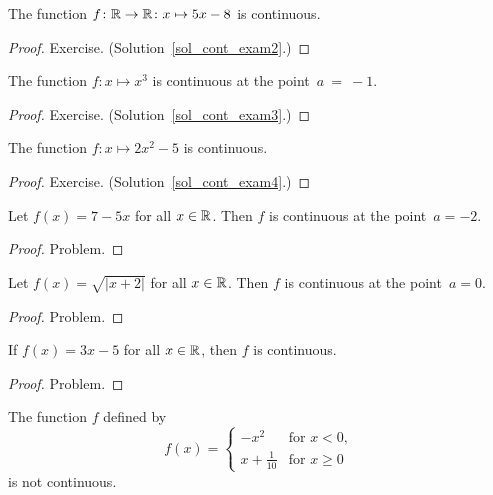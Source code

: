 \begin{exam}\label{cont_exam2} The function $f\colon\mathbb{R} \rightarrow \mathbb{R}\colon x \mapsto 5x - 8$ is continuous.
\end{exam}

\begin{proof} Exercise. (Solution~\ref{sol_cont_exam2}.)  \ns \end{proof}

\begin{exam}\label{cont_exam3} The function $f\colon x \mapsto x^3$ is continuous at the
point~$a~=~-1$.
\end{exam}

\begin{proof} Exercise. (Solution~\ref{sol_cont_exam3}.)  \ns \end{proof}

\begin{exam}\label{cont_exam4} The function $f\colon x \mapsto 2x^2 - 5$ is continuous.
\end{exam}

\begin{proof} Exercise.  (Solution~\ref{sol_cont_exam4}.)
  \ns \end{proof}

\begin{exam} Let $f(x) = 7 - 5x$ for all $x \in \mathbb{R}$. Then $f$ is continuous at the point~$a = -2$.
\end{exam}

\begin{proof} Problem.  \ns \end{proof}

\begin{exam} Let $f(x) = \sqrt{|x + 2|}$ for all $x \in \mathbb{R}$.  Then $f$ is continuous at the 
point~$a = 0$.
\end{exam}

\begin{proof} Problem. \ns \end{proof}

\begin{exam} If $f(x) = 3x - 5$ for all $x \in \mathbb{R}$, then $f$ is continuous.
\end{exam}

\begin{proof} Problem.  \ns \end{proof}

\begin{exam} The function $f$ defined by
 \[f(x) = \begin{cases}  -x^2        &\text{for $x < 0$}, \\
                    x+\frac1{10}    &\text{for $x \ge 0$}
          \end{cases}\]
is not continuous.
\end{exam}

